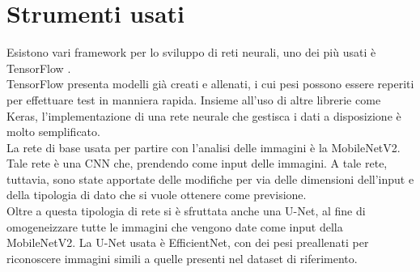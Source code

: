 \section{Strumenti usati}
\label{Strumenti usati}
Esistono vari framework per lo sviluppo di reti neurali, uno dei più usati è TensorFlow \cite{tsf}. 
\\
TensorFlow presenta modelli già creati e allenati, i cui pesi possono essere reperiti per effettuare test in manniera rapida.
Insieme all'uso di altre librerie come Keras, l'implementazione di una rete neurale che gestisca i dati a disposizione 
è molto semplificato.
\\
La rete di base usata per partire con l'analisi delle immagini è la MobileNetV2. Tale rete è una CNN che, prendendo come input delle 
immagini.
A tale rete, tuttavia, sono state apportate delle modifiche per via delle dimensioni dell'input e della tipologia di dato 
che si vuole ottenere come previsione.
\\
Oltre a questa tipologia di rete si è sfruttata anche una U-Net, al fine di omogeneizzare tutte le immagini che vengono date come input della MobileNetV2.
La U-Net usata è EfficientNet, con dei pesi preallenati \cite{unw} per riconoscere immagini simili a quelle presenti nel dataset di riferimento.

